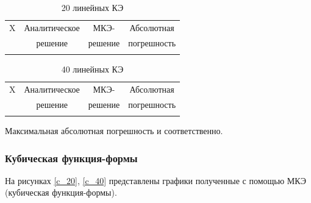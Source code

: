 {{{{{\begin{table}[H]
\centering
\begin{tabular}{|c|c|c|c|}
\hline
X & Аналитическое & МКЭ-    & Абсолютная \\
  & решение       & решение & погрешность \\
\hline
 \\
\hline
\end{tabular}
\caption{20 линейных КЭ}
\label{table:lin_20}
\end{table}

\begin{table}[H]
\centering
\begin{tabular}{|c|c|c|c|}
\hline
X & Аналитическое & МКЭ-    & Абсолютная \\
  & решение       & решение & погрешность \\
\hline
 \\
\hline
\end{tabular}
\caption{40 линейных КЭ}
\label{table:lin_40}
\end{table}

Максимальная абсолютная погрешность  и  соответственно.

\subsubsection{Кубическая функция-формы}

На рисунках \ref{c_20}, \ref{c_40} представлены графики полученные с помощью МКЭ (кубическая функция-формы).

}}}}}
